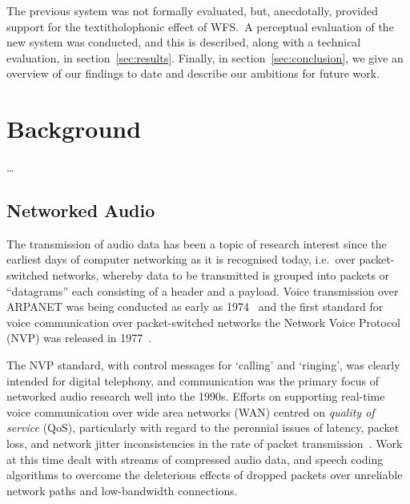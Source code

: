 \documentclass[utf8]{FrontiersinHarvard}
\newcommand{\secref}[1]{section~\ref{#1}}
\begin{document}
    The previous system was not formally evaluated, but, anecdotally, provided
    support for the textit{holophonic} effect of WFS.\
    A perceptual evaluation of the new system was conducted, and this is
    described, along with a technical evaluation, in \secref{sec:results}.
    Finally, in \secref{sec:conclusion}, we give an overview of our findings to
    date and describe our ambitions for future work.

    \section{Background}\label{sec:background}

    \dots

    \subsection{Networked Audio}\label{subsec:networked-audio}

    The transmission of audio data has been a topic of research interest since the
    earliest days of computer networking as it is recognised today, i.e.\ over
    packet-switched networks, whereby data to be transmitted is grouped into
    packets \textemdash{} or ``datagrams'' \textemdash{} each consisting of a header
    and a payload.
    Voice transmission over ARPANET was being conducted as early as
    1974~\citep{schulzrinne_voice_1992} and the first standard for voice
    communication over packet-switched networks \textemdash{} the Network Voice
    Protocol (NVP) \textemdash{} was released in
    1977~\citep{cohen_specifications_1977}.

    The NVP standard, with control messages for `calling' and `ringing', was
    clearly intended for digital telephony, and communication was the primary
    focus of networked audio research well into the 1990s.
    Efforts on supporting real-time voice communication over wide area networks
    (WAN) centred on \textit{quality of service} (QoS), particularly with regard
    to the perennial issues of latency, packet loss, and network jitter
    \textemdash{} inconsistencies in the rate of packet
    transmission~\citep{hardman_reliable_1995,hardman_successful_1998}.
    Work at this time dealt with streams of compressed audio data, and speech
    coding algorithms to overcome the deleterious effects of dropped packets
    over unreliable network paths and low-bandwidth connections.
\end{document}

